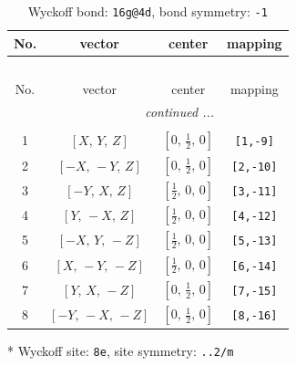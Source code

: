 \documentclass[fleqn,8pt]{jsarticle}
\begin{document}
\begin{longtable}{cccc}
\caption{Wyckoff bond: {\tt 16g@4d}, bond symmetry: {\tt -1}}
 \\
 \hline \hline
No. & vector & center & mapping \\ \hline \endfirsthead

\multicolumn{3}{l}{\tablename\ \thetable{}} \\
 \hline \hline
No. & vector & center & mapping \\ \hline \endhead

 \hline \hline
\multicolumn{3}{r}{\footnotesize\it continued ...} \\ \endfoot

 \hline \hline
\multicolumn{3}{r}{} \\ \endlastfoot

1 & $\left[ X,\, Y,\, Z \right]$ & $\left[ 0,\, \frac{1}{2},\, 0 \right]$ & {\tt [1,-9]} \\ \hline
2 & $\left[ - X,\, - Y,\, Z \right]$ & $\left[ 0,\, \frac{1}{2},\, 0 \right]$ & {\tt [2,-10]} \\ \hline
3 & $\left[ - Y,\, X,\, Z \right]$ & $\left[ \frac{1}{2},\, 0,\, 0 \right]$ & {\tt [3,-11]} \\ \hline
4 & $\left[ Y,\, - X,\, Z \right]$ & $\left[ \frac{1}{2},\, 0,\, 0 \right]$ & {\tt [4,-12]} \\ \hline
5 & $\left[ - X,\, Y,\, - Z \right]$ & $\left[ \frac{1}{2},\, 0,\, 0 \right]$ & {\tt [5,-13]} \\ \hline
6 & $\left[ X,\, - Y,\, - Z \right]$ & $\left[ \frac{1}{2},\, 0,\, 0 \right]$ & {\tt [6,-14]} \\ \hline
7 & $\left[ Y,\, X,\, - Z \right]$ & $\left[ 0,\, \frac{1}{2},\, 0 \right]$ & {\tt [7,-15]} \\ \hline
8 & $\left[ - Y,\, - X,\, - Z \right]$ & $\left[ 0,\, \frac{1}{2},\, 0 \right]$ & {\tt [8,-16]} \\
\end{longtable}
* Wyckoff site: {\tt 8e}, site symmetry: {\tt ..2/m}
\renewcommand{\arraystretch}{1.2}
\end{document}
